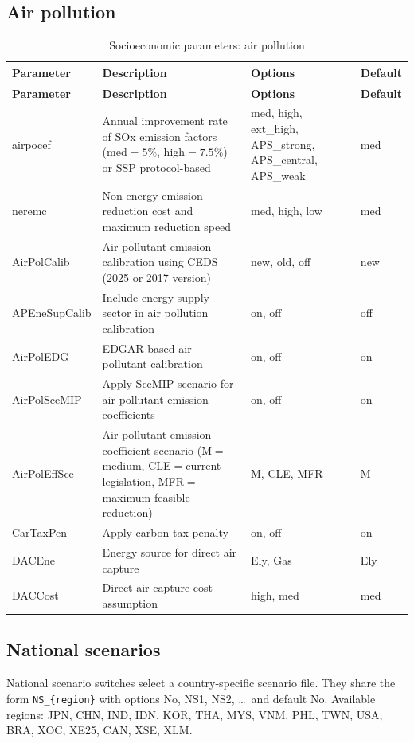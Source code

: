 \documentclass[10pt,a4paper,titlepage,dvipdfmx]{book}
\begin{document}
\subsection{Air pollution}
\begin{longtable}{|p{}|p{}|p{}|p{}|}
\caption{Socioeconomic parameters: air pollution}\label{tab:sp-soc-airpol}\\
\hline
\textbf{Parameter} & \textbf{Description} & \textbf{Options} & \textbf{Default} \\ \hline
\endfirsthead
\hline
\textbf{Parameter} & \textbf{Description} & \textbf{Options} & \textbf{Default} \\ \hline
\endhead
\hline
\endfoot
airpocef & Annual improvement rate of SOx emission factors (med$=5\%$, high$=7.5\%$) or SSP protocol-based & med, high, ext\_high, APS\_strong, APS\_central, APS\_weak & med \\ \hline
neremc & Non-energy emission reduction cost and maximum reduction speed & med, high, low & med \\ \hline
AirPolCalib & Air pollutant emission calibration using CEDS (2025 or 2017 version) & new, old, off & new \\ \hline
APEneSupCalib & Include energy supply sector in air pollution calibration & on, off & off \\ \hline
AirPolEDG & EDGAR-based air pollutant calibration & on, off & on \\ \hline
AirPolSceMIP & Apply SceMIP scenario for air pollutant emission coefficients & on, off & on \\ \hline
AirPolEffSce & Air pollutant emission coefficient scenario (M$=$medium, CLE$=$current legislation, MFR$=$maximum feasible reduction) & M, CLE, MFR & M \\ \hline
CarTaxPen & Apply carbon tax penalty & on, off & on \\ \hline
DACEne & Energy source for direct air capture & Ely, Gas & Ely \\ \hline
DACCost & Direct air capture cost assumption & high, med & med \\ \hline
\end{longtable}

\subsection{National scenarios}
National scenario switches select a country-specific scenario file. They share
the form \texttt{NS\_\{region\}} with options No, NS1, NS2, \ldots\ and default
No. Available regions: JPN, CHN, IND, IDN, KOR, THA, MYS, VNM, PHL, TWN, USA,
BRA, XOC, XE25, CAN, XSE, XLM.
\end{document}
